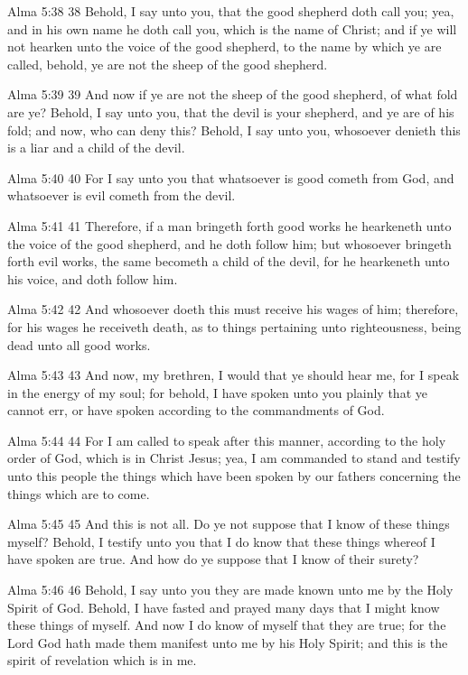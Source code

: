 Alma 5:38
 38 Behold, I say unto you, that the good shepherd doth call you;
yea, and in his own name he doth call you, which is the name of
Christ; and if ye will not hearken unto the voice of the good
shepherd, to the name by which ye are called, behold, ye are not
the sheep of the good shepherd.

Alma 5:39
 39 And now if ye are not the sheep of the good shepherd, of what
fold are ye? Behold, I say unto you, that the devil is your
shepherd, and ye are of his fold; and now, who can deny this?
Behold, I say unto you, whosoever denieth this is a liar and a
child of the devil.

Alma 5:40
 40 For I say unto you that whatsoever is good cometh from God,
and whatsoever is evil cometh from the devil.

Alma 5:41
 41 Therefore, if a man bringeth forth good works he hearkeneth
unto the voice of the good shepherd, and he doth follow him; but
whosoever bringeth forth evil works, the same becometh a child of
the devil, for he hearkeneth unto his voice, and doth follow him.

Alma 5:42
 42 And whosoever doeth this must receive his wages of him;
therefore, for his wages he receiveth death, as to things
pertaining unto righteousness, being dead unto all good works.

Alma 5:43
 43 And now, my brethren, I would that ye should hear me, for I
speak in the energy of my soul; for behold, I have spoken unto
you plainly that ye cannot err, or have spoken according to the
commandments of God.

Alma 5:44
 44 For I am called to speak after this manner, according to the
holy order of God, which is in Christ Jesus; yea, I am commanded
to stand and testify unto this people the things which have been
spoken by our fathers concerning the things which are to come.

Alma 5:45
 45 And this is not all. Do ye not suppose that I know of these
things myself? Behold, I testify unto you that I do know that
these things whereof I have spoken are true. And how do ye
suppose that I know of their surety?

Alma 5:46
 46 Behold, I say unto you they are made known unto me by the
Holy Spirit of God. Behold, I have fasted and prayed many days
that I might know these things of myself. And now I do know of
myself that they are true; for the Lord God hath made them
manifest unto me by his Holy Spirit; and this is the spirit of
revelation which is in me.


